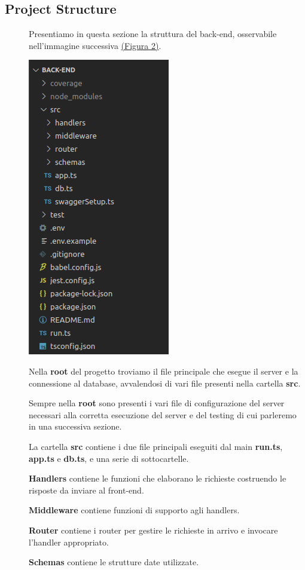\documentclass{article}
\begin{document}
\subsection{Project Structure}
\begin{description}
    \item[] Presentiamo in questa sezione la struttura del back-end, osservabile nell'immagine successiva \hyperref[img:2]{(Figura 2)}.
    \item[] \label{img:2} \begin{center}
            \includegraphics[scale=0.5]{structure.png}
        \end{center}
    \item[] Nella \textbf{root} del progetto troviamo il file principale che esegue il server e la connessione al database, avvalendosi di vari file presenti nella cartella \textbf{src}.
    \item[] Sempre nella \textbf{root} sono presenti i vari file di configurazione del server necessari alla corretta esecuzione del server e del testing di cui parleremo in una successiva sezione.
    \item[] La cartella \textbf{src} contiene i due file principali eseguiti dal main \textbf{run.ts}, \textbf{app.ts} e \textbf{db.ts}, e una serie di sottocartelle.
    \item[] \textbf{Handlers} contiene le funzioni che elaborano le richieste costruendo le risposte da inviare al front-end.
    \item[] \textbf{Middleware} contiene funzioni di supporto agli handlers.
    \item[] \textbf{Router} contiene i router per gestire le richieste in arrivo e invocare l'handler appropriato.
    \item[] \textbf{Schemas} contiene le strutture date utilizzate.
\end{description}
\clearpage
\end{document}
